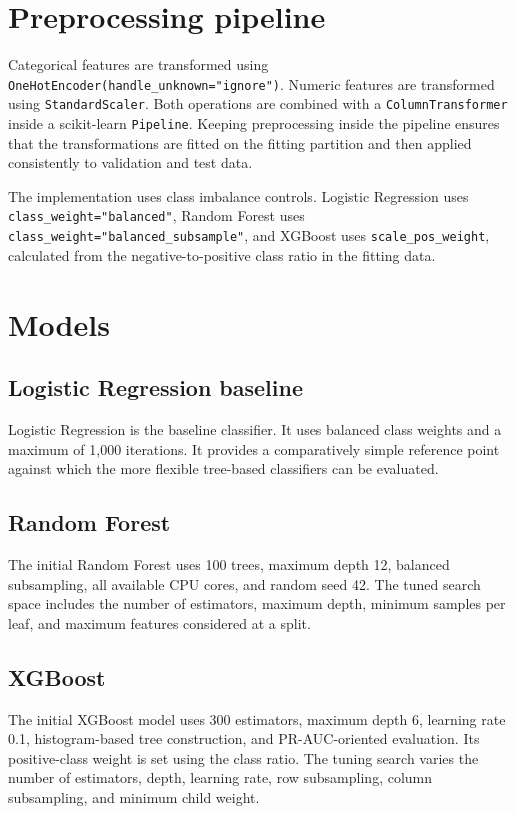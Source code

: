 \documentclass[12pt,a4paper]{report}
\begin{document}
\section{Preprocessing pipeline}
Categorical features are transformed using \texttt{OneHotEncoder(handle\_unknown="ignore")}. Numeric features are transformed using \texttt{StandardScaler}. Both operations are combined with a \texttt{ColumnTransformer} inside a scikit-learn \texttt{Pipeline}. Keeping preprocessing inside the pipeline ensures that the transformations are fitted on the fitting partition and then applied consistently to validation and test data.

The implementation uses class imbalance controls. Logistic Regression uses \texttt{class\_weight="balanced"}, Random Forest uses \texttt{class\_weight="balanced\_subsample"}, and XGBoost uses \texttt{scale\_pos\_weight}, calculated from the negative-to-positive class ratio in the fitting data.

\section{Models}
\subsection{Logistic Regression baseline}
Logistic Regression is the baseline classifier. It uses balanced class weights and a maximum of 1,000 iterations. It provides a comparatively simple reference point against which the more flexible tree-based classifiers can be evaluated.

\subsection{Random Forest}
The initial Random Forest uses 100 trees, maximum depth 12, balanced subsampling, all available CPU cores, and random seed 42. The tuned search space includes the number of estimators, maximum depth, minimum samples per leaf, and maximum features considered at a split.

\subsection{XGBoost}
The initial XGBoost model uses 300 estimators, maximum depth 6, learning rate 0.1, histogram-based tree construction, and PR-AUC-oriented evaluation. Its positive-class weight is set using the class ratio. The tuning search varies the number of estimators, depth, learning rate, row subsampling, column subsampling, and minimum child weight.
\end{document}
